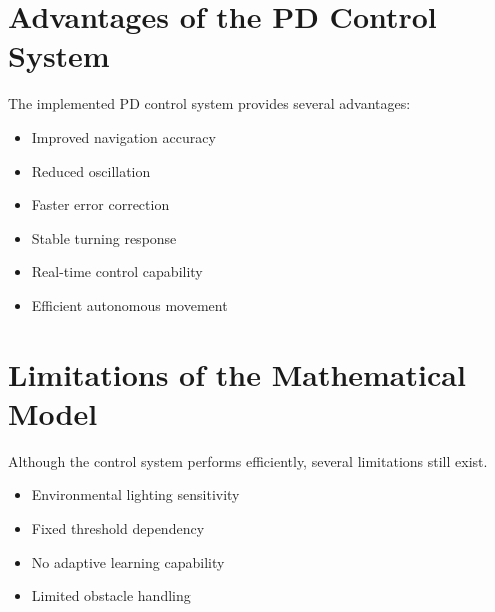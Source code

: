 \documentclass[12pt,a4paper,oneside]{report}
\begin{document}

\section{Advantages of the PD Control System}

The implemented PD control system provides several advantages:

\begin{itemize}

\item Improved navigation accuracy

\item Reduced oscillation

\item Faster error correction

\item Stable turning response

\item Real-time control capability

\item Efficient autonomous movement

\end{itemize}


\section{Limitations of the Mathematical Model}

Although the control system performs efficiently, several limitations still exist.

\begin{itemize}

\item Environmental lighting sensitivity

\item Fixed threshold dependency

\item No adaptive learning capability

\item Limited obstacle handling

\end{itemize}
\end{document}
